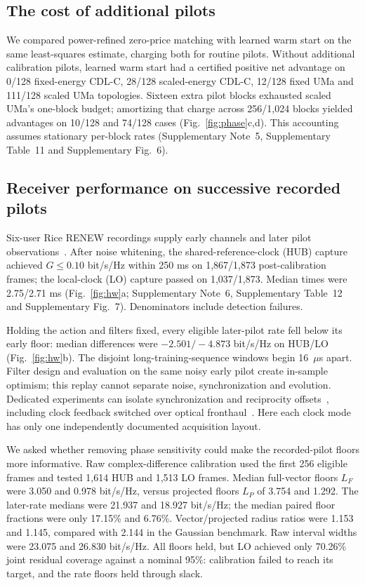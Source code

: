 \documentclass[lineno,pdflatex,sn-nature]{sn-jnl}
\begin{document}
\subsection*{The cost of additional pilots}
We compared power-refined zero-price matching with learned warm start on the same least-squares estimate, charging both for routine pilots. Without additional calibration pilots, learned warm start had a certified positive net advantage on 0/128 fixed-energy CDL-C, 28/128 scaled-energy CDL-C, 12/128 fixed UMa and 111/128 scaled UMa topologies. Sixteen extra pilot blocks exhausted scaled UMa's one-block budget; amortizing that charge across 256/1,024 blocks yielded advantages on 10/128 and 74/128 cases (Fig.~\ref{fig:phase}c,d). This accounting assumes stationary per-block rates (Supplementary Note~5, Supplementary Table~11 and Supplementary Fig.~6).



\subsection*{Receiver performance on successive recorded pilots}
Six-user Rice RENEW recordings supply early channels and later pilot observations~\cite{zafari,renew}. After noise whitening, the shared-reference-clock (HUB) capture achieved \(G\leq0.10\) bit/s/Hz within 250 ms on 1,867/1,873 post-calibration frames; the local-clock (LO) capture passed on 1,037/1,873. Median times were 2.75/2.71 ms (Fig.~\ref{fig:hw}a; Supplementary Note~6, Supplementary Table~12 and Supplementary Fig.~7). Denominators include detection failures.

Holding the action and filters fixed, every eligible later-pilot rate fell below its early floor: median differences were \(-2.501/-4.873\) bit/s/Hz on HUB/LO (Fig.~\ref{fig:hw}b). The disjoint long-training-sequence windows begin 16~\(\mu\)s apart. Filter design and evaluation on the same noisy early pilot create in-sample optimism; this replay cannot separate noise, synchronization and evolution. Dedicated experiments can isolate synchronization and reciprocity offsets~\cite{rogalin,vieira,ganesan}, including clock feedback switched over optical fronthaul~\cite{zhangsync2026}. Here each clock mode has only one independently documented acquisition layout.

We asked whether removing phase sensitivity could make the recorded-pilot floors more informative. Raw complex-difference calibration used the first 256 eligible frames and tested 1,614 HUB and 1,513 LO frames. Median full-vector floors \(L_F\) were 3.050 and 0.978 bit/s/Hz, versus projected floors \(L_P\) of 3.754 and 1.292. The later-rate medians were 21.937 and 18.927 bit/s/Hz; the median paired floor fractions were only 17.15\% and 6.76\%. Vector/projected radius ratios were 1.153 and 1.145, compared with 2.144 in the Gaussian benchmark. Raw interval widths were 23.075 and 26.830 bit/s/Hz. All floors held, but LO achieved only 70.26\% joint residual coverage against a nominal 95\%: calibration failed to reach its target, and the rate floors held through slack.
\end{document}
